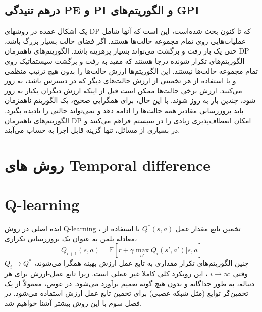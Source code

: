 %

\subsection{درهم تنیدگی PE و PI و الگوریتم‌های GPI}


%
%
%
یک اشکال عمده در روشهای DP که تا کنون بحث شده‌است، این است که آنها شامل عملیات‌هایی روی تمام مجموعه حالت‌ها هستند.
اگر فضای حالت بسیار بزرگ باشد،
حتی یک بار رفت و برگشت می‌تواند بسیار پرهزینه باشد.
الگوریتم‌های ناهمزمان DP الگوریتم‌های تکرار شونده درجا هستند که مقید به رفت و برگشت سیستماتیک روی تمام مجموعه حالت‌ها نیستند. این الگوریتم‌ها ارزش حالت‌ها را بدون هیچ ترتیب منظمی ‌و با استفاده از هر تخمینی از ارزش حالت‌های دیگر که در دسترس باشد، به روز می‌کنند.
 ارزش برخی حالت‌ها ممکن است قبل از اینکه ارزش دیگران یکبار به روز شود، چندین بار به روز شوند. با این حال، برای همگرایی صحیح، یک الگوریتم ناهمزمان باید بروزرسانی مقادیر همه حالت‌ها را ادامه دهد و نمی‌تواند حالتی را نادیده بگیرد.
الگوریتم‌های ناهمزمان DP امکان انعطاف‌پذیری زیادی را در سیستم فراهم می‌کنند و در بسیاری از مسائل، تنها گزینه قابل اجرا به حساب می‌آیند.

\section{روش های Temporal difference}
\section{Q-learning}
ایده اصلی در روش 
Q-learning
، تخمین تابع مقدار عمل  
$Q^*(s,a)$ 
با استفاده از معادله بلمن به عنوان یک بروزرسانی تکراری،
$$Q_{i+1}(s,a) = \mathbb{E}[r+ \gamma \max_{a'} Q_i(s',a')|s,a]$$
چنین الگوریتم‌های تکرار مقداری به تابع عمل-ارزش بهینه همگرا می‌شوند، 
$Q_i \longrightarrow Q^*$
وقتی
$i \longrightarrow \infty$
، این رویکرد کلی کاملا غیر عملی است.
زیرا تابع عمل-ارزش برای هر دنباله، به طور جداگانه و بدون هیچ گونه تعمیم برآورد می‌شود. در عوض، معمولاً از یک تخمین‌گر توابع (مثل شبکه عصبی) برای تخمین تابع عمل-ارزش استفاده می‌شود. در فصل سوم با این روش بیشتر آشنا خواهیم شد.
